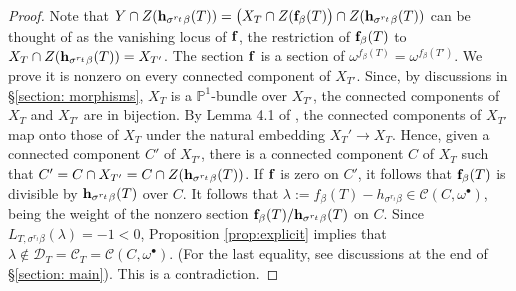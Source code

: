 \documentclass[11pt,pdflatex]{amsart}
\theoremstyle{plain}
\theoremstyle{definition}
\theoremstyle{plain}
\theoremstyle{definition}
\theoremstyle{remark}
\numberwithin{equation}{section}
\numberwithin{figure}{section} \numberwithin{table}{subsection}
\newcommand{\calC}{{\mathcal{C}}}
\newcommand{\calD}{{\mathcal{D}}}
\def\PP{\mathbb{P}}
\begin{document}
\begin{proof}
 Note that $Y\cap Z({\bf h}_{\sigma^{r_t}\beta}(T))=\big(X_T \cap Z({\bf f}_\beta(T)\big) \cap Z({\bf h}_{\sigma^{r_t}\beta}(T))$ can be thought of as the vanishing locus of ${\bf f}$, the restriction of ${\bf f}_\beta(T)$ to $X_T \cap Z({\bf h}_{\sigma^{r_t}\beta}(T))=X_{T'}$. 
  The section ${\bf f}$ is a  section of $\omega^{f_\beta(T)}=\omega^{f_\beta(T')}$. We prove it is nonzero on every connected component  of $X_{T'}$. Since, by discussions in \S\ref{section: morphisms}, $X_T$ is a $\PP^1$-bundle over $X_{T'}$, the connected components of $X_T$ and $X_{T'}$ are in bijection. By Lemma 4.1 of \cite{DK1}, the connected components of $X_{T'}$ map onto those of $X_T$ under the natural embedding $X_T' \rightarrow X_T$.  Hence, given a connected component $C'$ of $X_{T'}$, there is a connected component $C$ of $X_T$ such that $C'=C \cap X_{T'}=C \cap Z({\bf h}_{\sigma^{r_t}\beta}(T))$. If ${\bf f}$ is zero on $C'$, it follows that ${\bf f}_\beta(T)$ is divisible by ${\bf h}_{\sigma^{r_t}\beta}(T)$ over $C$. It follows that $\lambda:=f_\beta(T)-h_{\sigma^{r_t}\beta}\in \calC(C,\omega^\bullet)$, being the weight of the nonzero section ${\bf f}_\beta(T)/{\bf h}_{\sigma^{r_t}\beta}(T)$ on $C$.  Since  $L_{T,\sigma^{r_t}\beta}(\lambda)=-1<0$,  Proposition \ref{prop:explicit} implies that $\lambda \not\in \calD_T=\calC_T=\calC(C, \omega^{\bullet}).$ (For the last equality, see discussions at the end of \S \ref{section: main}). This is a contradiction. 


\end{proof}
\end{document}

